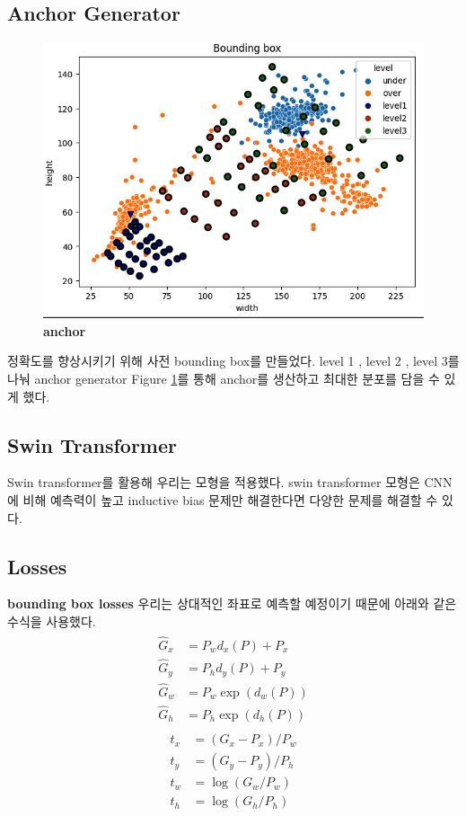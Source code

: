 \documentclass[10pt,twocolumn,letterpaper]{article}
\begin{document}
\subsection{Anchor Generator}
\begin{figure}[htp!]
  \includegraphics[width=\linewidth]{figure/anchor}
     \caption{\small \textbf{anchor} }
  \label{anchor}
  \end{figure}
정확도를 향상시키기 위해 사전 bounding box를 만들었다.
level 1 , level 2 , level 3를 나눠 anchor generator Figure \ref{anchor}를 통해 anchor를 생산하고 최대한 분포를 담을 수 있게 했다.
\subsection{Swin Transformer}
Swin transformer\cite{liu2021swin}를 활용해 우리는 모형을 적용했다.
swin transformer 모형은 CNN에 비해 예측력이 높고 inductive bias 문제만 해결한다면 다양한 문제를 해결할 수 있다.




\subsection{Losses}
\textbf{bounding box losses}\cite{r-cnn} 우리는 상대적인 좌표로 예측할 예정이기 때문에 아래와 같은 수식을 사용했다.
\begin{align}
  \begin{split}
    \hat{G}_x &=P_w d_x(P)+P_x \\
    \hat{G}_y &=P_h d_y(P)+P_y \\
    \hat{G}_w &=P_w \exp \left(d_w(P)\right) \\
    \hat{G}_h &=P_h \exp \left(d_h(P)\right)
  \end{split}
\end{align}
\begin{align}
  \begin{split}
  t_x  &=\left(G_x-P_x\right) / P_w \\
  t_y  &=\left(G_y-P_y\right) / P_h \\
  t_w  &=\log \left(G_w / P_w\right) \\
  t_h  &=\log \left(G_h / P_h\right)
  \end{split}
\end{align}
\end{document}
